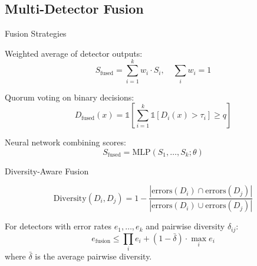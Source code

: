 \documentclass[
  ignorenonframetext,
]{beamer}
\begin{document}
\subsection{Multi-Detector Fusion}\label{sec:detector-fusion}

\begin{frame}[allowframebreaks]{Fusion Strategies}
\protect{}\label{fusion-strategies}
\begin{definition}
\label{def:score-fusion}
Weighted average of detector outputs:
\begin{equation}
\label{eq:score-fusion}
S_{\text{fused}} = \sum_{i=1}^k w_i \cdot S_i, \quad \sum_i w_i = 1
\end{equation}
\end{definition}

\begin{definition}
\label{def:decision-fusion}
Quorum voting on binary decisions:
\begin{equation}
\label{eq:decision-fusion}
D_{\text{fused}}(x) = \mathbb{1}\left[\sum_{i=1}^k \mathbb{1}[D_i(x) > \tau_i] \geq q\right]
\end{equation}
\end{definition}

\begin{definition}
\label{def:learned-fusion}
Neural network combining scores:
\begin{equation}
\label{eq:learned-fusion}
S_{\text{fused}} = \text{MLP}(S_1, \ldots, S_k; \theta)
\end{equation}
\end{definition}
\end{frame}

\begin{frame}[allowframebreaks]{Diversity-Aware Fusion}
\protect{}\label{diversity-aware-fusion}
\begin{definition}
\label{def:detector-diversity}
\begin{equation}
\label{eq:detector-diversity}
\text{Diversity}(D_i, D_j) = 1 - \frac{|\text{errors}(D_i) \cap \text{errors}(D_j)|}{|\text{errors}(D_i) \cup \text{errors}(D_j)|}
\end{equation}
\end{definition}

\begin{theorem}
\label{thm:diversity-benefit}
For detectors with error rates $e_1, \ldots, e_k$ and pairwise diversity $\delta_{ij}$:
\begin{equation}
\label{eq:diversity-benefit}
e_{\text{fusion}} \leq \prod_i e_i + (1 - \bar{\delta}) \cdot \max_i e_i
\end{equation}
where $\bar{\delta}$ is the average pairwise diversity.
\end{theorem}

\end{frame}
\end{document}
